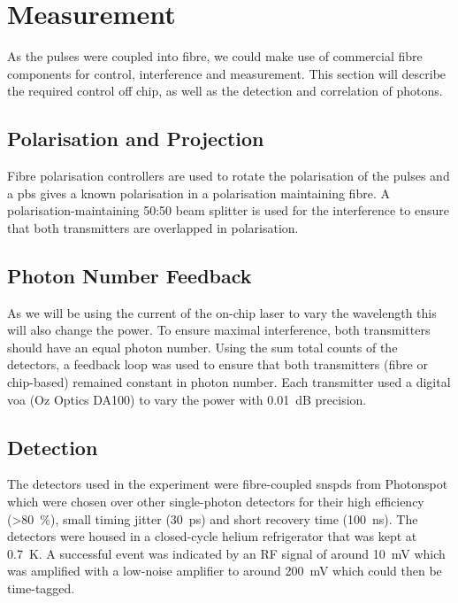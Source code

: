 \section{Measurement}



As the pulses were coupled into fibre, we could make use of commercial fibre components for control, interference and measurement. This section will describe the required control off chip, as well as the detection and correlation of photons.

\subsection{Polarisation and Projection}

Fibre polarisation controllers are used to rotate the polarisation of the pulses and a \ac{pbs} gives a known polarisation in a polarisation maintaining fibre. A polarisation-maintaining {50:50} beam splitter is used for the interference to ensure that both transmitters are overlapped in polarisation.

\subsection{Photon Number Feedback}

As we will be using the current of the on-chip laser to vary the wavelength this will also change the power. To ensure maximal interference, both transmitters should have an equal photon number. Using the sum total counts of the detectors, a feedback loop was used to ensure that both transmitters (fibre or chip-based) remained constant in photon number. Each transmitter used a digital \ac{voa} (Oz Optics DA100) to vary the power with \SI{0.01}{dB} precision.

\subsection{Detection}

The detectors used in the experiment were fibre-coupled \acp{snspd} from Photonspot which were chosen over other single-photon detectors for their high efficiency (\SI{>80}{\percent}), small timing jitter (\SI{30}{\ps}) and short recovery time (\SI{100}{\ns}). The detectors were housed in a closed-cycle helium refrigerator that was kept at \SI{0.7}{K}. A successful event was indicated by an RF signal of around \SI{10}{\mV} which was amplified with a low-noise amplifier to around \SI{200}{\mV} which could then be time-tagged.

